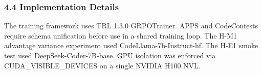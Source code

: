 \subsubsection{4.4 Implementation Details}

The training framework uses TRL 1.3.0 GRPOTrainer. APPS and CodeContests require schema unification before use in a shared training loop. The H-M1 advantage variance experiment used CodeLlama-7b-Instruct-hf. The H-E1 smoke test used DeepSeek-Coder-7B-base. GPU isolation was enforced via CUDA_VISIBLE_DEVICES on a single NVIDIA H100 NVL.
